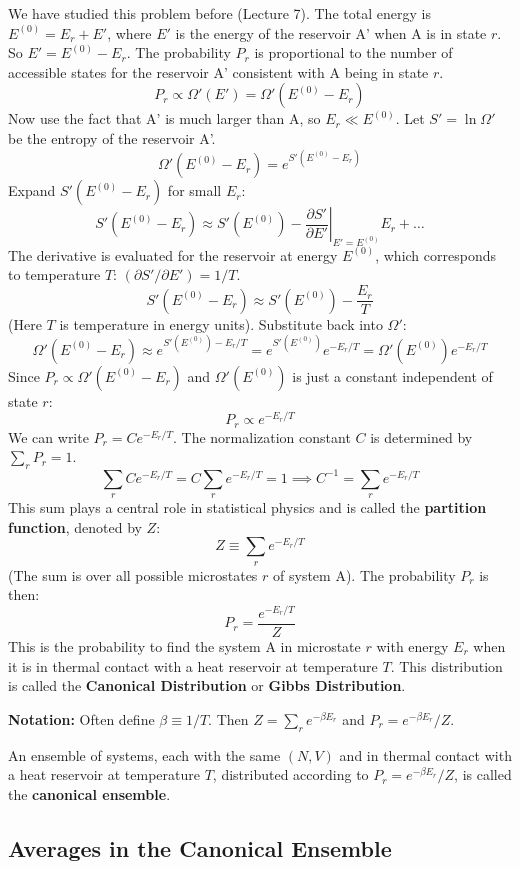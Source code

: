 \documentclass[11pt]{article}
\newcommand{\pderiv}[2]{\frac{\partial #1}{\partial #2}}
\begin{document}
We have studied this problem before (Lecture 7). The total energy is $E^{(0)} = E_r + E'$, where $E'$ is the energy of the reservoir A' when A is in state $r$. So $E' = E^{(0)} - E_r$.
The probability $P_r$ is proportional to the number of accessible states for the reservoir A' consistent with A being in state $r$.
\[ P_r \propto \Omega'(E') = \Omega'(E^{(0)} - E_r) \]
Now use the fact that A' is much larger than A, so $E_r \ll E^{(0)}$.
Let $S' = \ln \Omega'$ be the entropy of the reservoir A'.
\[ \Omega'(E^{(0)} - E_r) = e^{S'(E^{(0)} - E_r)} \]
Expand $S'(E^{(0)} - E_r)$ for small $E_r$:
\[ S'(E^{(0)} - E_r) \approx S'(E^{(0)}) - \left. \pderiv{S'}{E'} \right|_{E' = E^{(0)}} E_r + \dots \]
The derivative is evaluated for the reservoir at energy $E^{(0)}$, which corresponds to temperature $T$: $(\partial S' / \partial E') = 1/T$.
\[ S'(E^{(0)} - E_r) \approx S'(E^{(0)}) - \frac{E_r}{T} \]
(Here $T$ is temperature in energy units).
Substitute back into $\Omega'$:
\[ \Omega'(E^{(0)} - E_r) \approx e^{S'(E^{(0)}) - E_r/T} = e^{S'(E^{(0)})} e^{-E_r/T} = \Omega'(E^{(0)}) e^{-E_r/T} \]
Since $P_r \propto \Omega'(E^{(0)} - E_r)$ and $\Omega'(E^{(0)})$ is just a constant independent of state $r$:
\[ P_r \propto e^{-E_r/T} \]
We can write $P_r = C e^{-E_r/T}$. The normalization constant $C$ is determined by $\sum_r P_r = 1$.
\[ \sum_r C e^{-E_r/T} = C \sum_r e^{-E_r/T} = 1 \implies C^{-1} = \sum_r e^{-E_r/T} \]
This sum plays a central role in statistical physics and is called the \textbf{partition function}, denoted by $Z$:
\[ Z \equiv \sum_r e^{-E_r/T} \]
(The sum is over all possible microstates $r$ of system A).
The probability $P_r$ is then:
\[ P_r = \frac{e^{-E_r/T}}{Z} \]
This is the probability to find the system A in microstate $r$ with energy $E_r$ when it is in thermal contact with a heat reservoir at temperature $T$. This distribution is called the \textbf{Canonical Distribution} or \textbf{Gibbs Distribution}.

\textbf{Notation:} Often define $\beta \equiv 1/T$. Then $Z = \sum_r e^{-\beta E_r}$ and $P_r = e^{-\beta E_r} / Z$.

An ensemble of systems, each with the same $(N, V)$ and in thermal contact with a heat reservoir at temperature $T$, distributed according to $P_r = e^{-\beta E_r} / Z$, is called the \textbf{canonical ensemble}.

\subsection*{Averages in the Canonical Ensemble}
\end{document}
